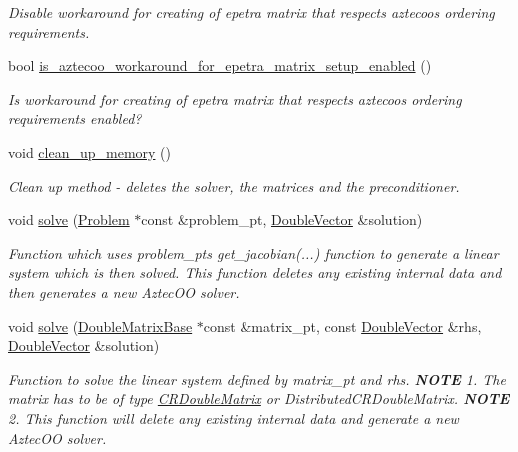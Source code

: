 \begin{DoxyCompactItemize}
\begin{DoxyCompactList}\small\item\em Disable workaround for creating of epetra matrix that respects aztecoo\textquotesingle{}s ordering requirements. \end{DoxyCompactList}\item 
bool \hyperlink{classoomph_1_1TrilinosAztecOOSolver_ac17e7d21595ce4b9b854f0207f3b04be}{is\+\_\+aztecoo\+\_\+workaround\+\_\+for\+\_\+epetra\+\_\+matrix\+\_\+setup\+\_\+enabled} ()
\begin{DoxyCompactList}\small\item\em Is workaround for creating of epetra matrix that respects aztecoo\textquotesingle{}s ordering requirements enabled? \end{DoxyCompactList}\item 
void \hyperlink{classoomph_1_1TrilinosAztecOOSolver_a365a39ae1dec32eb78aa160b70426f59}{clean\+\_\+up\+\_\+memory} ()
\begin{DoxyCompactList}\small\item\em Clean up method -\/ deletes the solver, the matrices and the preconditioner. \end{DoxyCompactList}\item 
void \hyperlink{classoomph_1_1TrilinosAztecOOSolver_a7dc1ae7f05e8a50416b8df700f832eb9}{solve} (\hyperlink{classoomph_1_1Problem}{Problem} $\ast$const \&problem\+\_\+pt, \hyperlink{classoomph_1_1DoubleVector}{Double\+Vector} \&solution)
\begin{DoxyCompactList}\small\item\em Function which uses problem\+\_\+pt\textquotesingle{}s get\+\_\+jacobian(...) function to generate a linear system which is then solved. This function deletes any existing internal data and then generates a new Aztec\+OO solver. \end{DoxyCompactList}\item 
void \hyperlink{classoomph_1_1TrilinosAztecOOSolver_a7d2853c49429224fc2deb3260340b190}{solve} (\hyperlink{classoomph_1_1DoubleMatrixBase}{Double\+Matrix\+Base} $\ast$const \&matrix\+\_\+pt, const \hyperlink{classoomph_1_1DoubleVector}{Double\+Vector} \&rhs, \hyperlink{classoomph_1_1DoubleVector}{Double\+Vector} \&solution)
\begin{DoxyCompactList}\small\item\em Function to solve the linear system defined by matrix\+\_\+pt and rhs. {\bfseries N\+O\+TE} 1. The matrix has to be of type \hyperlink{classoomph_1_1CRDoubleMatrix}{C\+R\+Double\+Matrix} or Distributed\+C\+R\+Double\+Matrix. {\bfseries N\+O\+TE} 2. This function will delete any existing internal data and generate a new Aztec\+OO solver. \end{DoxyCompactList}\item 

\end{DoxyCompactItemize}
